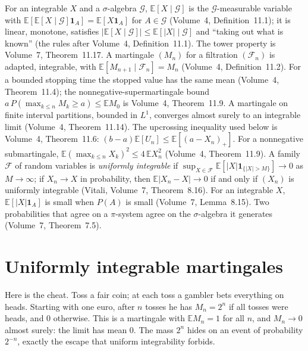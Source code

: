 \begin{reminder}
For an integrable $X$ and a $\sigma$-algebra $\mathcal G$, $\mathbb E[X\mid\mathcal G]$ is the $\mathcal G$-measurable variable with $\mathbb E[\mathbb E[X\mid\mathcal G]\mathbf 1_A]=\mathbb E[X\mathbf 1_A]$ for $A\in\mathcal G$
(Volume~4, Definition~11.1); it is linear, monotone, satisfies $|\mathbb E[X\mid\mathcal G]|\le\mathbb E[|X|\mid\mathcal G]$ and ``taking out what is known''
(the rules after Volume~4, Definition~11.1). The tower property is Volume~7, Theorem~11.17. A martingale $(M_n)$ for a filtration $(\mathcal F_n)$ is adapted, integrable, with $\mathbb E[M_{n+1}\mid\mathcal F_n]=M_n$ (Volume~4, Definition~11.2). For a bounded stopping time the stopped value has the same mean (Volume~4, Theorem~11.4); the nonnegative-supermartingale bound $a\,P(\max_{k\le n}M_k\ge a)\le\mathbb EM_0$ is Volume~4, Theorem~11.9. A martingale on finite interval partitions, bounded in $L^1$, converges almost surely to an integrable limit (Volume~4, Theorem~11.14). The upcrossing inequality used below is Volume~4, Theorem~11.6: $(b-a)\mathbb E[U_n]\le\mathbb E[(a-X_n)_+]$. For a nonnegative submartingale, $\mathbb E(\max_{k\le n}X_k)^2\le4\,\mathbb EX_n^2$ (Volume~4, Theorem~11.9).
A family $\mathcal F$ of random variables is \emph{uniformly integrable} if $\sup_{X\in\mathcal F}\mathbb E[|X|\mathbf 1_{\{|X|>M\}}]\to0$ as $M\to\infty$; if $X_n\to X$ in probability, then $\mathbb E|X_n-X|\to0$
if and only if $(X_n)$ is uniformly integrable (Vitali, Volume~7, Theorem~8.16). For an integrable $X$, $\mathbb E[|X|\mathbf 1_A]$ is small when $P(A)$ is small (Volume~7, Lemma~8.15).
Two probabilities that agree on a $\pi$-system agree on the $\sigma$-algebra it generates (Volume~7, Theorem~7.5).
\end{reminder}

\section{Uniformly integrable martingales}

Here is the cheat. Toss a fair coin; at each toss a gambler bets everything on heads. Starting with one euro, after $n$ tosses he has $M_n=2^n$ if all tosses were heads, and
$0$ otherwise. This is a martingale with $\mathbb EM_n=1$ for all $n$, and $M_n\to0$ almost surely: the limit has mean $0$. The mass $2^n$ hides on an event of probability $2^{-n}$,
exactly the escape that uniform integrability forbids.

